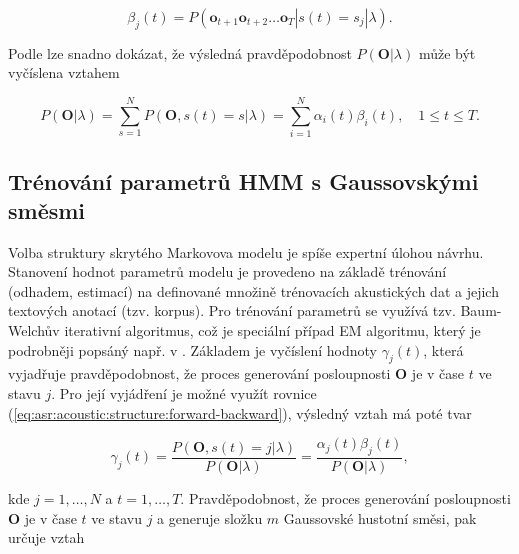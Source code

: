 \begin{equation}
  \beta_j\left(t\right) = P\left(\boldsymbol{o}_{t+1}\boldsymbol{o}_{t+2}\dots \boldsymbol{o}_T|s\left(t\right)=s_j|\lambda\right).
  \label{eq:asr:acoustic:structure:backward}
\end{equation}

\noindent Podle \cite{Psutka2006} lze snadno dokázat, že výsledná pravděpodobnost $P\left(\boldsymbol{O}|\lambda\right)$ může být vyčíslena vztahem

\begin{equation}
  P\left(\boldsymbol{O}|\lambda\right) = \sum_{s=1}^{N} P\left(\boldsymbol{O}, s\left(t\right) = s | \lambda\right) = \sum_{i = 1}^{N} \alpha_{i}\left(t\right)\beta_{i}\left(t\right), \quad 1 \leq t \leq T.
  \label{eq:asr:acoustic:structure:forward-backward}
\end{equation}


\subsection{Trénování parametrů HMM s Gaussovskými směsmi}
\label{chap:asr:acoustic:GMM}

Volba struktury skrytého Markovova modelu je spíše expertní úlohou návrhu. Stanovení hodnot parametrů modelu je provedeno na základě trénování (odhadem, estimací) na definované množině trénovacích akustických dat a jejich textových anotací (tzv. korpus). Pro trénování parametrů se využívá tzv. Baum-Welchův iterativní algoritmus, což je speciální případ EM algoritmu, který je podrobněji popsáný např. v \cite{Holmes2001}. Základem je vyčíslení hodnoty $\gamma_{j}\left(t\right)$, která vyjadřuje pravděpodobnost, že proces generování posloupnosti $\boldsymbol{O}$ je v čase $t$ ve stavu $j$. Pro její vyjádření je možné využít rovnice (\ref{eq:asr:acoustic:structure:forward-backward}), výsledný vztah má poté tvar

\begin{equation}
  \gamma_{j}\left(t\right) = \frac{P\left(\boldsymbol{O}, s\left(t\right)=j|\lambda\right)}{P\left(\boldsymbol{O}|\lambda\right)} = \frac{\alpha_{j}\left(t\right)\beta_{j}\left(t\right)}{P\left(\boldsymbol{O}|\lambda\right)} ,
   \label{eq:asr:acoustic:structure:gamma}
\end{equation}

\noindent kde $j = 1,\dots,N$ a $t = 1, \dots, T$. Pravděpodobnost, že proces generování posloupnosti $\boldsymbol{O}$ je v čase $t$ ve stavu $j$ a generuje složku $m$ Gaussovské hustotní směsi, pak určuje vztah

